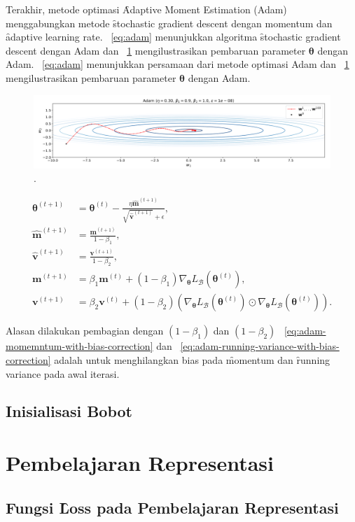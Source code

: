 Terakhir, metode optimasi \f{Adaptive Moment Estimation} (Adam) menggabungkan metode \f{stochastic gradient descent} dengan momentum dan \f{adaptive learning rate}. \equ~\ref{eq:adam} menunjukkan algoritma \f{stochastic gradient descent} dengan Adam dan \pic~\ref{fig:adam} mengilustrasikan pembaruan parameter $\bm{\theta}$ dengan Adam. \equ~\ref{eq:adam} menunjukkan persamaan dari metode optimasi Adam dan \pic~\ref{fig:adam} mengilustrasikan pembaruan parameter $\bm{\theta}$ dengan Adam.
\begin{figure}
    \centering
    \includegraphics[width=1\textwidth]{assets/pics/adam.png}
    \caption{\license.}
    \label{fig:adam}
\end{figure}
\begin{align}
    \label{eq:adam}
    \bm{\theta}^{(t+1)} &= \bm{\theta}^{(t)} - \frac{\eta \hat{\mathbf{m}}^{(t+1)}}{\sqrt{\hat{\mathbf{v}}^{(t+1)}} + \epsilon}, \\
    \label{eq:adam-momemntum-with-bias-correction}
    \hat{\mathbf{m}}^{(t+1)} &= \frac{\mathbf{m}^{(t+1)}}{1 - \beta_1}, \\
    \label{eq:adam-running-variance-with-bias-correction}
    \hat{\mathbf{v}}^{(t+1)} &= \frac{\mathbf{v}^{(t+1)}}{1 - \beta_2}, \\
    \mathbf{m}^{(t+1)} &= \beta_1 \mathbf{m}^{(t)} + (1 - \beta_1) \nabla_{\bm{\theta}} L_{\mathcal{B}}(\bm{\theta}^{(t)}), \\
    \mathbf{v}^{(t+1)} &= \beta_2 \mathbf{v}^{(t)} + (1 - \beta_2) \left(\nabla_{\bm{\theta}} L_{\mathcal{B}}(\bm{\theta}^{(t)})\odot \nabla_{\bm{\theta}} L_{\mathcal{B}}(\bm{\theta}^{(t)})\right).
\end{align}

Alasan dilakukan pembagian dengan $(1-\beta_1)$ dan $(1-\beta_2)$ \equ~\ref{eq:adam-momemntum-with-bias-correction} dan \equ~\ref{eq:adam-running-variance-with-bias-correction} adalah untuk menghilangkan bias pada \f{momentum} dan \f{running variance} pada awal iterasi.

\subsection{Inisialisasi Bobot}
    \label{sec:kaiminginit}

\section{Pembelajaran Representasi}

    \subsection{Fungsi \f{Loss} pada Pembelajaran Representasi}













        

